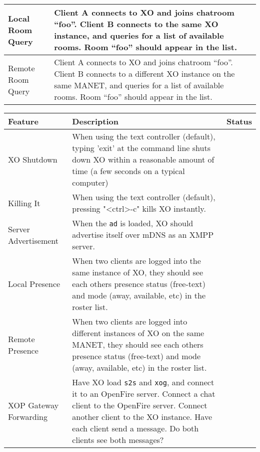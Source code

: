 \documentclass{article}
\begin{document}
\begin{tabular}{|p{3cm}|p{7.25cm}|r|}
Local Room Query & Client A connects to XO and joins chatroom ``foo''.  Client
B connects to the same XO instance, and queries for a list of available rooms.
Room ``foo'' should appear in the list. & \\ \hline

Remote Room Query & Client A connects to XO and joins chatroom ``foo''.
    Client B connects to a different XO instance on the same MANET, and queries
    for a list of available rooms.  Room ``foo'' should appear in the list. 
        & \\ \hline

\end{tabular}

\noindent \begin{tabular}{|p{3cm}|p{7.25cm}|r|} \hline
\textbf{Feature} & \textbf{Description} & \textbf{Status} \\ \hline

XO Shutdown & When using the text controller (default), typing 'exit' at the
    command line shuts down XO within a reasonable amount of time (a few 
    seconds on a typical computer) & \\ \hline

Killing It & When using the text controller (default), pressing "<ctrl>-c"
    kills XO instantly. & \\ \hline

Server Advertisement & When the \texttt{ad} is loaded, XO should advertise
    itself over mDNS as an XMPP server. & \\ \hline

Local Presence & When two clients are logged into the same instance of XO,
    they should see each others presence status (free-text) and mode (away,
    available, etc) in the roster list. & \\ \hline

Remote Presence & When two clients are logged into different instances of XO on
    the same MANET, they should see each others presence status (free-text) and
    mode (away, available, etc) in the roster list. & \\ \hline

XOP Gateway Forwarding & Have XO load \texttt{s2s} and \texttt{xog}, and
    connect it to an OpenFire server.  Connect a chat client to the OpenFire
    server.  Connect another client to the XO instance.  Have each client send
    a message.  Do both clients see both messages? & \\ \hline

\end{tabular}
\end{document}
